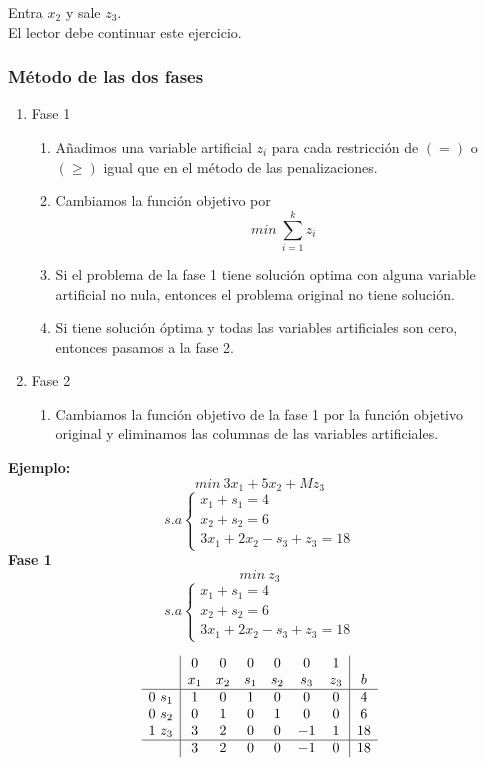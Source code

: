 \documentclass[11pt,fleqn]{book} %
\begin{document}
Entra $x_2$ y sale $z_3$. \\
El lector debe continuar este ejercicio.

\subsubsection{Método de las dos fases}
\begin{enumerate}
	\item Fase 1
	\begin{enumerate}
		\item Añadimos una variable artificial $z_i$ para cada restricción de $(=)$ o $(\geq)$ igual que en el método de las penalizaciones.
		\item Cambiamos la función objetivo por
		$$ min ~ \sum_{i=1}^{k}z_i $$
		\item Si el problema de la fase 1 tiene solución optima con alguna variable artificial no nula, entonces el problema original no tiene solución.
		\item Si tiene solución óptima y todas las variables artificiales son cero, entonces pasamos a la fase 2.
	\end{enumerate}
	\item Fase 2
	\begin{enumerate}
		\item Cambiamos la función objetivo de la fase 1 por la función objetivo original y eliminamos las columnas de las variables artificiales.
	\end{enumerate}
\end{enumerate}

\textbf{Ejemplo: }
$$ min ~ 3x_1+5x_2+M z_3 $$
$$ s.a \left\{
\begin{array}{c}
x_1+s_1=4 \\
x_2 + s_2 = 6 \\
3x_1+2x_2-s_3+z_3=18
\end{array}
\right.
$$
\textbf{Fase 1}
$$ min ~ z_3 $$
$$ s.a \left\{
\begin{array}{c}
x_1+s_1=4 \\
x_2 + s_2 = 6 \\
3x_1+2x_2-s_3+z_3=18
\end{array}
\right.
$$

$$
\begin{array}{c|cccccc|c}
& 0 & 0 & 0 & 0 & 0 & 1 & \\
& x_1 & x_2 & s_1 & s_2 & s_3 & z_3 & b \\ \hline
0 ~ s_1 & 1 & 0 & 1 & 0 & 0 & 0 & 4 \\
0 ~ s_2 & 0 & 1 & 0 & 1 & 0 & 0 & 6 \\
1 ~ z_3 & 3 & 2 & 0 & 0 & -1 & 1 & 18 \\ \hline
& 3 & 2 & 0 & 0 & -1 & 0 & 18
\end{array}
$$
\end{document}
